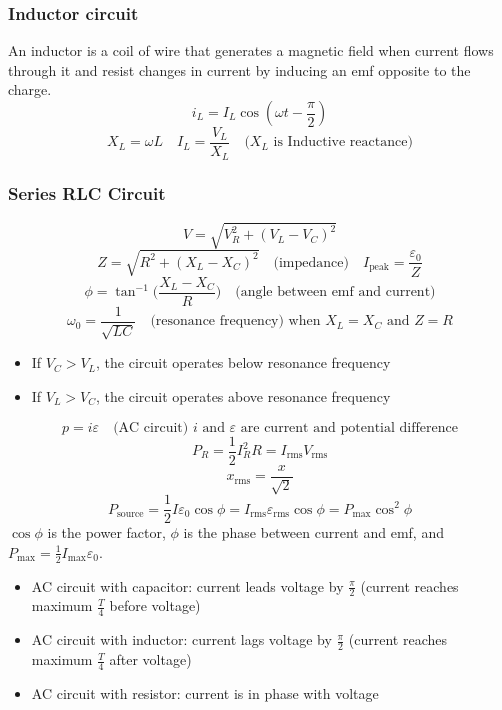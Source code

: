 \documentclass[8pt,twocolumn]{extarticle}
\begin{document}
\subsubsection*{Inductor circuit}
An inductor is a coil of wire that generates a magnetic field when current flows through it and
resist changes in current by inducing an emf opposite to the charge.
\[i_L = I_L\cos(\omega t - \frac{\pi}{2})\]
\[X_L=\omega L\quad I_L=\frac{V_L}{X_L}\quad\text{($X_L$ is Inductive reactance)}\]
\subsubsection*{Series RLC Circuit}
\[V=\sqrt{V_R^2 + {(V_L - V_C)}^2}\]
\[Z=\sqrt{R^2 + {(X_L - X_C)}^2}\quad\text{(impedance)}\quad I_\text{peak}=\frac{\varepsilon_0}{Z}
\]
\[\phi = \tan^{-1}\Big(\frac{X_L - X_C}{R}\Big)\quad\text{(angle between emf and current)}\]
\[\omega_0 = \frac{1}{\sqrt{LC}}\quad\text{(resonance frequency) when $X_L=X_C$ and $Z=R$}\]
\begin{itemize}
    \item If $V_C > V_L$, the circuit operates below resonance frequency
    \item If $V_L > V_C$, the circuit operates above resonance frequency
\end{itemize}
\[p=i\varepsilon\quad\text{(AC circuit) $i$ and $\varepsilon$ are current and potential difference}
\]
\[P_R = \frac{1}{2}I_R^2 R=I_\text{rms}V_\text{rms}\]
\[x_\text{rms}=\frac{x}{\sqrt{2}}\]
\[P_\text{source}=\frac{1}{2}I\varepsilon_0\cos\phi = I_\text{rms}\varepsilon_\text{rms}\cos\phi=
P_\text{max}\cos^2\phi\]
$\cos\phi$ is the power factor, $\phi$ is the phase between current and emf, and $P_\text{max}=
\frac{1}{2}I_\text{max}\varepsilon_0$.
\begin{itemize}
    \item AC circuit with capacitor: current leads voltage by $\frac{\pi}{2}$ (current reaches
    maximum $\frac{T}{4}$ before voltage)
    \item AC circuit with inductor: current lags voltage by $\frac{\pi}{2}$ (current reaches
    maximum $\frac{T}{4}$ after voltage)
    \item AC circuit with resistor: current is in phase with voltage
\end{itemize}
\end{document}
